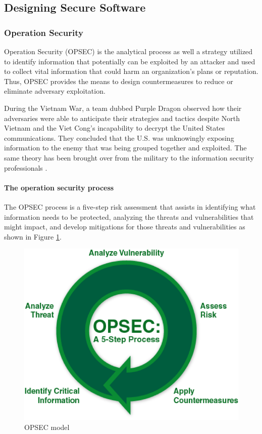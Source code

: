 \subsection{Designing Secure Software}

\subsubsection{Operation Security}\label{sec:opsec}
Operation Security (OPSEC) is the analytical process as well a strategy utilized to identify information that potentially can be exploited by an attacker and used to collect vital information that could harm an organization's plans or reputation. Thus, OPSEC provides the means to design countermeasures to reduce or eliminate adversary exploitation.

During the Vietnam War, a team dubbed Purple Dragon observed how their adversaries were able to anticipate their strategies and tactics despite North Vietnam and the Viet Cong's incapability to decrypt the United States communications. They concluded that the U.S. was unknowingly exposing information to the enemy that was being grouped together and exploited. The same theory has been brought over from the military to the information security professionals \cite{tunggal_what_2021}.

\paragraph{The operation security process}
The OPSEC process is a five-step risk assessment that assists in identifying what information needs to be protected, analyzing the threats and vulnerabilities that might impact, and develop mitigations for those threats and vulnerabilities as shown in Figure \ref{fig:opsec}.

\begin{figure}[!h]
    \centering
    \includegraphics[width=.5\textwidth]{../../img/chapter_2/opsec-model.png}
    \caption{OPSEC model}
    \label{fig:opsec}
\end{figure}


